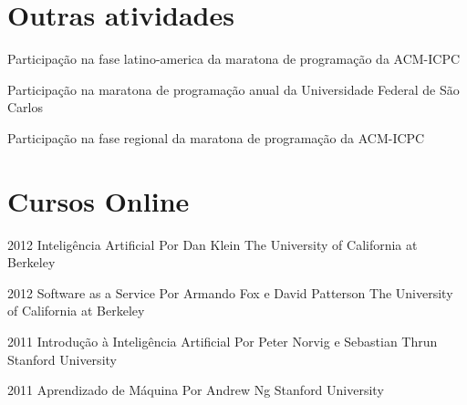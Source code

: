 \documentclass[]{friggeri-cv}
\begin{document}
\section{Outras atividades}



\begin{entrylist}

{Participação na fase latino-america da maratona de programação da ACM-ICPC}{}{}


{Participação na maratona de programação anual da Universidade Federal de São Carlos}{}{}

{Participação na fase regional da maratona de programação da ACM-ICPC}{}{}



\end{entrylist}



\section{Cursos Online}
\begin{entrylist}
\entry
{\phantom{}2012}
{Inteligência Artificial}
{Por Dan Klein}
{The University of California at Berkeley}

\entry
{\phantom{}2012}
{Software as a Service}
{Por Armando Fox e David Patterson}
{The University of California at Berkeley}

\entry
{\phantom{}2011}
{Introdução à Inteligência Artificial}
{Por Peter Norvig e Sebastian Thrun}
{Stanford University}

\entry
{\phantom{}2011}
{Aprendizado de Máquina}
{Por Andrew Ng}
{Stanford University}

\end{entrylist}
\end{document}
